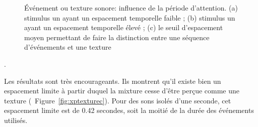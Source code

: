 \begin{figure}[t]
        \myfloatalign
         \par
        \caption[Événement ou texture sonore: influence de la période d'attention]{Événement ou texture sonore: influence de la période d'attention. (a) stimulus un ayant un espacement temporelle faible ; (b) stimulus un ayant un espacement temporelle élevé ; (c) le seuil d'espacement moyen permettant de faire la distinction entre une séquence d'événements et une texture }\label{fig:xptexture}
\end{figure}

.

Les résultats sont très encourageants. Ils montrent qu'il existe bien un espacement limite à partir duquel la mixture cesse d'être perçue comme une texture (\cf~Figure~\ref{fig:xptexturec}). Pour des sons isolés d'une seconde, cet espacement limite est de 0.42 secondes, soit la moitié de la durée des événements utilisés.

 



